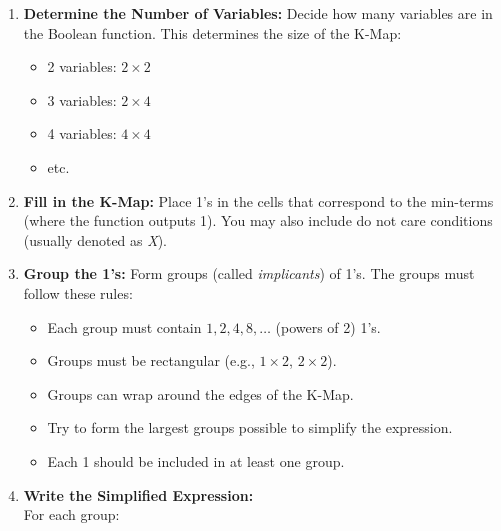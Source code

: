 \begin{enumerate}
	
	\item \textbf{Determine the Number of Variables:} Decide how many variables are in the 
		   Boolean function. This determines the size of the K-Map:
	      
		\begin{itemize}
		 
			\item 2 variables: \(2 \times 2\)
		 	
			\item 3 variables: \(2 \times 4\)
		 
			\item 4 variables: \(4 \times 4\)
		 
			\item etc.
	  
		\end{itemize}

	\item \textbf{Fill in the K-Map:} Place 1's in the cells that correspond to the min-terms 
		  (where the function outputs 1). You may also include do not care conditions 
		  (usually denoted as \emph{X}).

	\item \textbf{Group the 1's:} Form groups (called \emph{implicants}) of 1's. 
		   The groups must follow these rules:
	      
		\begin{itemize}
		 
			\item Each group must contain \(1, 2, 4, 8, \ldots\) (powers of 2) 1's.
		 
			\item Groups must be rectangular (e.g., \(1 \times 2\), \(2 \times 2\)).
		 
			\item Groups can wrap around the edges of the K-Map.
		 
			\item Try to form the largest groups possible to simplify the expression.
		 
			\item Each 1 should be included in at least one group.
	 
		\end{itemize}

	\item \textbf{Write the Simplified Expression:} \\
	      For each group:


\end{enumerate}
